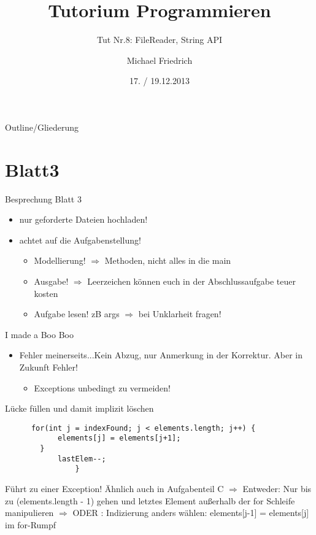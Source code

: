 \documentclass[18pt]{beamer}
\title[Prog Tut Nr. 8]{Tutorium Programmieren}
\subtitle{Tut Nr.8: FileReader, String API}
\author{Michael Friedrich}
\date{17. / 19.12.2013}
\institute{Institut f\"ur theoretische Informatik}
\begin{document}

\begin{frame}
	\titlepage
\end{frame}

\begin{frame}{Outline/Gliederung}
	\tableofcontents
\end{frame}

\section{Blatt3}
\begin{frame}{Besprechung Blatt 3}\pause
\begin{itemize}
	\item nur geforderte Dateien hochladen! \pause
	\item achtet auf die Aufgabenstellung! \pause
	\begin{itemize}
		\item Modellierung! $\Rightarrow$ Methoden, nicht alles in die main \pause
		\item Ausgabe! $\Rightarrow$ Leerzeichen können euch in der Abschlussaufgabe teuer kosten\pause
		\item Aufgabe lesen! zB args $\Rightarrow$ bei Unklarheit fragen!
	\end{itemize}
\end{itemize}
\end{frame}

\begin{frame}[fragile]{I made a Boo Boo}\pause
\begin{itemize}
	\item Fehler meinerseits...Kein Abzug, nur Anmerkung in der Korrektur. Aber in Zukunft Fehler!\pause
\begin{itemize}
	\item Exceptions unbedingt zu vermeiden!
\end{itemize}
\end{itemize}
\begin{block}{Lücke füllen und damit implizit löschen}\pause
\begin{lstlisting}
	  for(int j = indexFound; j < elements.length; j++) {
			elements[j] = elements[j+1];
		} 
			lastElem--;
				}
\end{lstlisting}
Führt zu einer Exception! Ähnlich auch in Aufgabenteil C \newline \pause
$\Rightarrow$ Entweder: Nur bis zu (elements.length - 1) gehen und letztes Element außerhalb der for Schleife manipulieren \newline \pause
$\Rightarrow$ ODER : Indizierung anders wählen: elements[j-1] = elements[j] im for-Rumpf
\end{block}
\end{frame}
\end{document}
